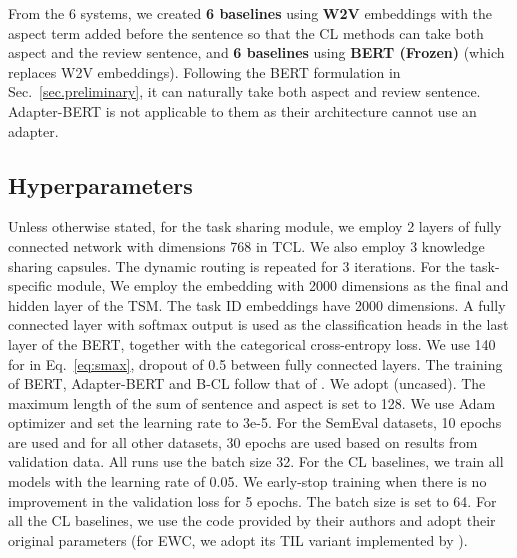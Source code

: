 \documentclass[11pt]{article}
\begin{document}
From the 6 systems, we created \textbf{6 baselines} using \textbf{W2V} embeddings with the aspect term added before the sentence so that the CL methods can take both aspect and the review sentence, and \textbf{6 baselines} using \textbf{BERT (Frozen)} (which replaces W2V embeddings). Following the BERT formulation in Sec.~\ref{sec.preliminary}, it can naturally take both aspect and review sentence. Adapter-BERT is not applicable to them as their architecture cannot use an adapter.
















\subsection{Hyperparameters}
Unless otherwise stated, for the task sharing module, we employ 2 layers of fully connected network with dimensions 768 in TCL. We also employ 3 knowledge sharing capsules. The dynamic routing is repeated for 3 iterations. For the task-specific module, We employ the embedding with 2000 dimensions as the final and hidden layer of the TSM. The task ID embeddings have 2000 dimensions. A fully connected layer with softmax output is used as the classification heads in the last layer of the BERT, together with the categorical cross-entropy loss. We use 140 for  in Eq.~\ref{eq:smax},
dropout of 0.5 between fully connected layers. The training of BERT, Adapter-BERT and B-CL follow that of \cite{DBLP:conf/naacl/XuLSY19}. We adopt  (uncased). The maximum length of the sum of sentence and aspect is set to 128. We use Adam optimizer and set the learning rate to 3e-5.
For the SemEval datasets, 10 epochs are used and for all other datasets, 30 epochs are used based on results from validation data.
All runs use the batch size 32. For the CL baselines, we train all models with the learning rate of 0.05. 
We early-stop training when there is no improvement in the validation loss for 5 epochs. The batch size is set to 64. {\color{black}For all the CL baselines, we use the code provided by their authors and adopt their original parameters (for EWC, we adopt its TIL variant
implemented by \cite{Serra2018overcoming}).}
\end{document}
